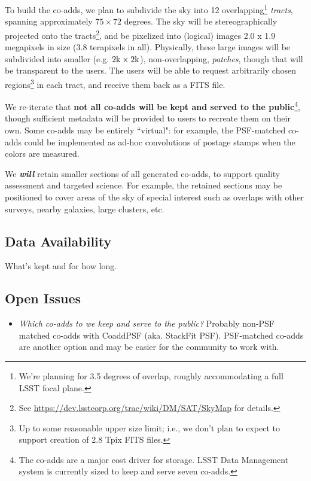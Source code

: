\documentclass[12pt]{article}
\begin{document}
To build the co-adds, we plan to subdivide the sky into 12 overlapping\footnote{We're planning for 3.5 degrees of overlap, roughly accommodating a full LSST focal plane.} {\em tracts}, spanning approximately $75 \times 72$ degrees. The sky will be stereographically projected onto the tracts\footnote{See \url{https://dev.lsstcorp.org/trac/wiki/DM/SAT/SkyMap} for details.}, and be pixelized into (logical) images 2.0 x 1.9 megapixels in size (3.8 terapixels in all). Physically, these large images will be subdivided into smaller (e.g. $2{\rm k} \times 2{\rm k}$), non-overlapping, {\em patches}, though that will be transparent to the users. The users will be able to request arbitrarily chosen regions\footnote{Up to some reasonable upper size limit; i.e., we don't plan to expect to support creation of 2.8 Tpix FITS files.} in each tract, and receive them back as a FITS file.

\vspace{1ex}

We re-iterate that {\bf not all co-adds will be kept and served to the public}\footnote{The co-adds are a major cost driver for storage. LSST Data Management system is currently sized to keep and serve seven co-adds.}, though sufficient metadata will be provided to users to recreate them on their own. Some co-adds may be entirely ``virtual": for example, the PSF-matched co-adds could be implemented as ad-hoc convolutions of postage stamps when the colors are measured.

We {\em \bf will} retain smaller sections of all generated co-adds, to support quality assessment and targeted science. For example, the retained sections may be positioned to cover areas of the sky of special interest such as overlaps with other surveys, nearby galaxies, large clusters, etc.

\subsection{Data Availability}

What's kept and for how long.

\subsection{Open Issues}

\begin{itemize}
    \item {\em Which co-adds to we keep and serve to the public?} Probably non-PSF matched co-adds with CoaddPSF (aka. StackFit PSF). PSF-matched co-adds are another option and may be easier for the community to work with.
\end{itemize}
\end{document}
